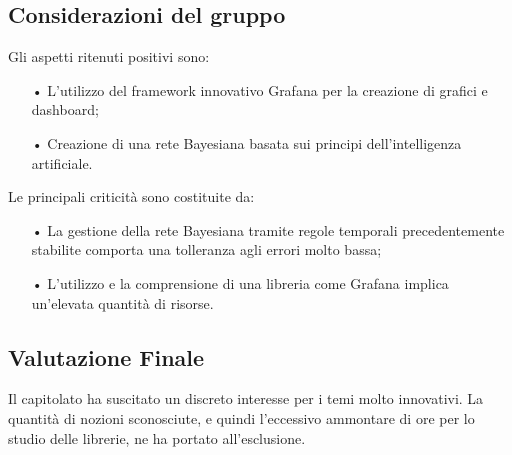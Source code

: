 \subsection{Considerazioni del gruppo}


Gli aspetti ritenuti positivi sono: 
\begin{itemize}
\item[•] L'utilizzo del framework innovativo Grafana per la creazione di grafici e dashboard;
\item[•] Creazione di una rete Bayesiana basata sui principi dell'intelligenza artificiale.
\end{itemize}

Le principali criticità sono costituite da: 
\begin{itemize}

\item[•]La gestione della rete Bayesiana tramite regole temporali precedentemente stabilite comporta una tolleranza agli errori molto bassa;

\item[•] L'utilizzo e la comprensione di una libreria come Grafana implica un'elevata quantità di risorse.
\end{itemize}

\subsection{Valutazione Finale}
Il capitolato ha suscitato un discreto interesse per i temi molto innovativi. 
La quantità di nozioni sconosciute, e quindi l'eccessivo ammontare di ore per lo studio delle librerie, ne ha portato all'esclusione. 
